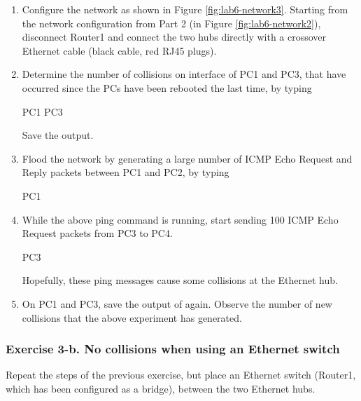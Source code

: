 \begin{enumerate}
	\item Configure the network as shown in Figure \ref{fig:lab6-network3}. Starting from the network configuration from Part 2 (in Figure \ref{fig:lab6-network2}), disconnect Router1 and connect the two hubs directly with a crossover Ethernet cable (black cable, red RJ45 plugs).
	\item Determine the number of collisions on interface  of PC1 and PC3, that have occurred since the PCs have been rebooted the last time, by typing
		\begin{cmdblock}
	PC1%
	PC3%
		\end{cmdblock}
		Save the output.
	\item Flood the network by generating a large number of ICMP Echo Request and Reply packets between PC1 and PC2, by typing
		\begin{cmdblock}
	PC1%
		\end{cmdblock}
	\item While the above ping command is running, start sending 100 ICMP Echo Request packets from PC3 to PC4.
		\begin{cmdblock}
	PC3%
		\end{cmdblock}
		Hopefully, these ping messages cause some collisions at the Ethernet hub.
	\item On PC1 and PC3, save the output of  again. Observe the number of new collisions that the above experiment has generated.
\end{enumerate}

\begin{questions}
\end{questions}

\subsubsection{Exercise 3-b. No collisions when using an Ethernet switch}
Repeat the steps of the previous exercise, but place an Ethernet switch (Router1, which has been configured as a bridge), between the two Ethernet hubs.

